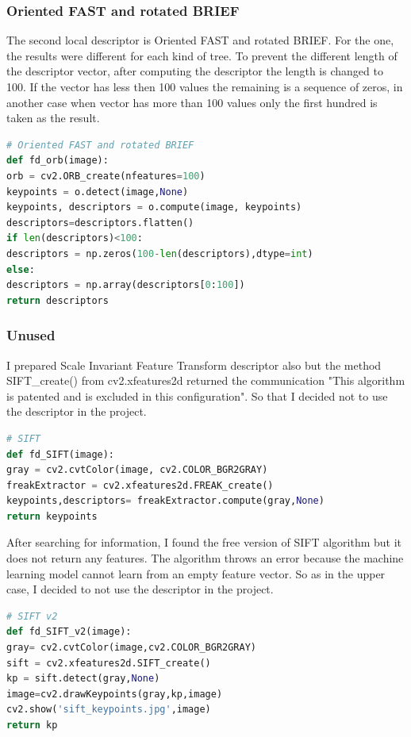 \documentclass[12pt]{article}
\begin{document}
\subsubsection{Oriented FAST and rotated BRIEF}

The second local descriptor is Oriented FAST and rotated BRIEF. For the one, the results were different for each kind of tree. To prevent the different length of the descriptor vector, after computing the descriptor the length is changed to 100. If the vector has less then 100 values the remaining is a sequence of zeros, in another case when vector has more than 100 values only the first hundred is taken as the result.

\begin{lstlisting}[language=Python]
# Oriented FAST and rotated BRIEF
def fd_orb(image):
orb = cv2.ORB_create(nfeatures=100)
keypoints = o.detect(image,None)
keypoints, descriptors = o.compute(image, keypoints)
descriptors=descriptors.flatten()
if len(descriptors)<100:
descriptors = np.zeros(100-len(descriptors),dtype=int)
else:
descriptors = np.array(descriptors[0:100])
return descriptors
\end{lstlisting}

\subsubsection{Unused}

I prepared Scale Invariant Feature Transform descriptor also but the method SIFT\_create() from cv2.xfeatures2d returned the communication "This algorithm is patented and is excluded in this configuration". So that I decided not to use the descriptor in the project.

\begin{lstlisting}[language=Python]
# SIFT
def fd_SIFT(image):
gray = cv2.cvtColor(image, cv2.COLOR_BGR2GRAY)
freakExtractor = cv2.xfeatures2d.FREAK_create()
keypoints,descriptors= freakExtractor.compute(gray,None)
return keypoints
\end{lstlisting}

After searching for information, I found the free version of SIFT algorithm but it does not return any features. The algorithm throws an error because the machine learning model cannot learn from an empty feature vector. So as in the upper case, I decided to not use the descriptor in the project.

\begin{lstlisting}[language=Python]
# SIFT v2
def fd_SIFT_v2(image):
gray= cv2.cvtColor(image,cv2.COLOR_BGR2GRAY)
sift = cv2.xfeatures2d.SIFT_create()
kp = sift.detect(gray,None)
image=cv2.drawKeypoints(gray,kp,image)
cv2.show('sift_keypoints.jpg',image)
return kp
\end{lstlisting}
\end{document}
